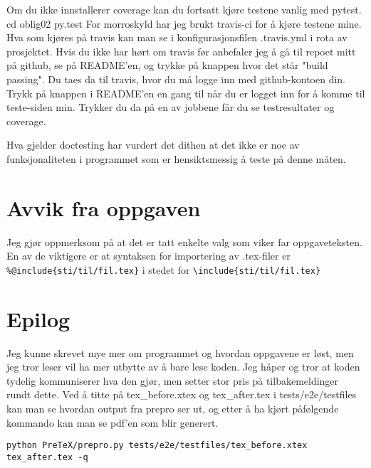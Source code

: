 \documentclass{article}
\newcommand{\code}[1]{\colorbox{codegray}{\texttt{#1}}}
\newcommand{\bs}[1]{{\texttt{\textbackslash #1}}}
\begin{document}
Om du ikke innstallerer coverage kan du fortsatt kjøre testene vanlig med pytest.
cd oblig02
py.test
For morroskyld har jeg brukt travis-ci for å kjøre testene mine. Hva som kjøres
på travis kan man se i konfigurasjonsfilen .travis.yml i rota av prosjektet.
Hvis du ikke har hørt om travis før anbefaler jeg å gå til repoet mitt på github,
se på README'en, og trykke på knappen hvor det står "build passing". Du taes
da til travis, hvor du må logge inn med github-kontoen din. Trykk på knappen i README'en
en gang til når du er logget inn for å komme til teste-siden min. Trykker du da på
en av jobbene får du se testresultater og coverage.

Hva gjelder doctesting har vurdert det dithen at det ikke er noe av funksjonaliteten
i programmet som er hensiktsmessig å teste på denne måten.


\section{Avvik fra oppgaven}
Jeg gjør oppmerksom på at det er tatt enkelte valg som viker far oppgaveteksten.
En av de viktigere er at syntaksen for importering av .tex-filer er
\code{\%@include\{sti/til/fil.tex\}} i stedet for \code{\bs include\{sti/til/fil.tex\}}


\section{Epilog}
Jeg kunne skrevet mye mer om programmet og hvordan oppgavene er løst, men
jeg tror leser vil ha mer utbytte av å bare lese koden. Jeg håper og tror
at koden tydelig kommuniserer hva den gjør, men setter stor pris på tilbakemeldinger
rundt dette.
Ved å titte på tex\_before.xtex og tex\_after.tex i tests/e2e/testfiles kan man
se hvordan output fra prepro ser ut, og etter å ha kjørt påfølgende kommando
kan man se pdf'en som blir generert.

\begin{Verbatim}[numbers=none,frame=lines,label=\fbox{{\tiny Terminal}},fontsize=\fontsize{9pt}{9pt},
labelposition=topline,framesep=2.5mm,framerule=0.7pt]
python PreTeX/prepro.py tests/e2e/testfiles/tex_before.xtex tex_after.tex -q
\end{Verbatim}
\noindent
\end{document}
